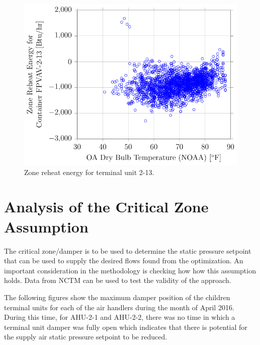 \begin{figure}
\centering
\includegraphics[]{Plots/2016-10-19-1521-ZoneReheatEnergyforContainerFPVAV213vsOADryBulbTemperatureNOAA.pdf}
\caption{Zone reheat energy for terminal unit 2-13.}
\label{fig:2016-10-19-1521-ZoneReheatEnergyforContainerFPVAV213vsOADryBulbTemperatureNOAA}
\end{figure}


\section{Analysis of the Critical Zone Assumption}

The critical zone/damper is to be used to determine the static pressure
setpoint that can be used to supply the desired flows found from the
optimization. An important consideration in the methodology is checking
how how this assumption holds. Data from NCTM can be used to test the
validity of the approach.

The following figures show the maximum damper position of the children
terminal units for each of the air handlers during the month of April
2016. During this time, for AHU-2-1 and AHU-2-2, there was no time in
which a terminal unit damper was fully open which indicates that there
is potential for the supply air static pressure setpoint to be reduced.  

\newcommand{\MaxDampCaption}[1]{Maximum damper position of all children terminal units versus \(\oat{}\) for #1 during the month of April 2016.}

